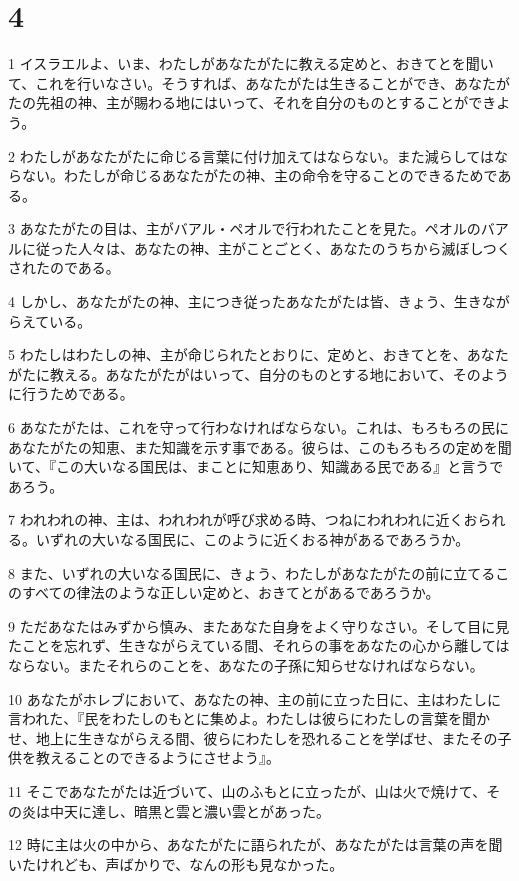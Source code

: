 \chapter{4}

\par 1 イスラエルよ、いま、わたしがあなたがたに教える定めと、おきてとを聞いて、これを行いなさい。そうすれば、あなたがたは生きることができ、あなたがたの先祖の神、主が賜わる地にはいって、それを自分のものとすることができよう。
\par 2 わたしがあなたがたに命じる言葉に付け加えてはならない。また減らしてはならない。わたしが命じるあなたがたの神、主の命令を守ることのできるためである。
\par 3 あなたがたの目は、主がバアル・ペオルで行われたことを見た。ペオルのバアルに従った人々は、あなたの神、主がことごとく、あなたのうちから滅ぼしつくされたのである。
\par 4 しかし、あなたがたの神、主につき従ったあなたがたは皆、きょう、生きながらえている。
\par 5 わたしはわたしの神、主が命じられたとおりに、定めと、おきてとを、あなたがたに教える。あなたがたがはいって、自分のものとする地において、そのように行うためである。
\par 6 あなたがたは、これを守って行わなければならない。これは、もろもろの民にあなたがたの知恵、また知識を示す事である。彼らは、このもろもろの定めを聞いて、『この大いなる国民は、まことに知恵あり、知識ある民である』と言うであろう。
\par 7 われわれの神、主は、われわれが呼び求める時、つねにわれわれに近くおられる。いずれの大いなる国民に、このように近くおる神があるであろうか。
\par 8 また、いずれの大いなる国民に、きょう、わたしがあなたがたの前に立てるこのすべての律法のような正しい定めと、おきてとがあるであろうか。
\par 9 ただあなたはみずから慎み、またあなた自身をよく守りなさい。そして目に見たことを忘れず、生きながらえている間、それらの事をあなたの心から離してはならない。またそれらのことを、あなたの子孫に知らせなければならない。
\par 10 あなたがホレブにおいて、あなたの神、主の前に立った日に、主はわたしに言われた、『民をわたしのもとに集めよ。わたしは彼らにわたしの言葉を聞かせ、地上に生きながらえる間、彼らにわたしを恐れることを学ばせ、またその子供を教えることのできるようにさせよう』。
\par 11 そこであなたがたは近づいて、山のふもとに立ったが、山は火で焼けて、その炎は中天に達し、暗黒と雲と濃い雲とがあった。
\par 12 時に主は火の中から、あなたがたに語られたが、あなたがたは言葉の声を聞いたけれども、声ばかりで、なんの形も見なかった。
